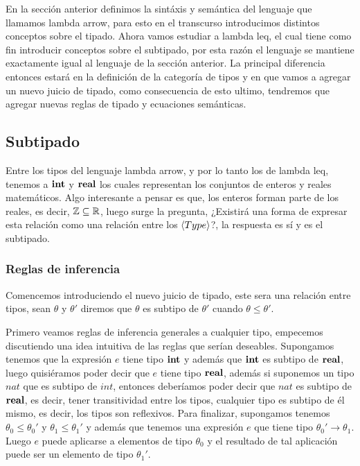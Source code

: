 En la secci\'on anterior definimos la sint\'axis y sem\'antica del lenguaje que llamamos
lambda arrow, para esto en el transcurso introducimos distintos conceptos sobre el tipado.
Ahora vamos estudiar a lambda leq, el cual tiene como fin introducir conceptos sobre
el subtipado, por esta raz\'on el lenguaje se mantiene exactamente igual al lenguaje 
de la secci\'on anterior. La principal diferencia entonces estar\'a en la definici\'on
de la categor\'ia de tipos y en que vamos a agregar un nuevo juicio de tipado, como
consecuencia de esto ultimo, tendremos que agregar nuevas reglas de tipado y ecuaciones 
sem\'anticas.\\

\subsection{Subtipado}

Entre los tipos del lenguaje lambda arrow, y por lo tanto los de lambda leq, tenemos
a $\textbf{int}$ y $\textbf{real}$ los cuales representan los conjuntos de enteros y reales matem\'aticos.
Algo interesante a pensar es que, los enteros forman parte de los reales, es decir,
$\mathbb{Z} \subseteq \mathbb{R}$, luego surge la pregunta, ¿Existir\'a una forma de expresar esta relaci\'on 
como una relaci\'on entre los $\langle Type \rangle$?, la respuesta es s\'i y es el subtipado.\\

\subsubsection{Reglas de inferencia}

Comencemos introduciendo el nuevo juicio de tipado, este sera una relaci\'on entre tipos,
sean $\theta$ y $\theta'$ diremos que $\theta$ es subtipo de $\theta'$ cuando $\theta \leq \theta'$.

Primero veamos reglas de inferencia generales a cualquier tipo, empecemos discutiendo
una idea intuitiva de las reglas que ser\'ian deseables. Supongamos tenemos que la expresi\'on
$e$ tiene tipo $\textbf{int}$ y adem\'as que $\textbf{int}$ es subtipo de $\textbf{real}$, luego quisi\'eramos 
poder decir que $e$ tiene tipo $\textbf{real}$, adem\'as si suponemos un tipo $nat$ que es
subtipo de $int$, entonces deber\'iamos poder decir que $nat$ es subtipo de $\textbf{real}$,
es decir, tener transitividad entre los tipos, cualquier tipo es
subtipo de \'el mismo, es decir, los tipos son reflexivos. Para finalizar, 
supongamos tenemos $\theta_0 \leq \theta_0'$ y $\theta_1 \leq \theta_1'$ y adem\'as
que tenemos una expresi\'on $e$ que tiene tipo $\theta_0' \rightarrow \theta_1$. Luego
$e$ puede aplicarse a elementos de tipo $\theta_0$ y el resultado de tal aplicaci\'on
puede ser un elemento de tipo $\theta_1'$.

